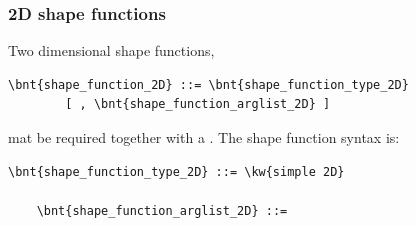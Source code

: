 \begin{enumerate}
\subsubsection{2D shape functions}
\label{sec:shape function 2D}
Two dimensional shape functions,
\begin{Verbatim}[commandchars=\\\{\}]
    \bnt{shape_function_2D} ::= \bnt{shape_function_type_2D}
        [ , \bnt{shape_function_arglist_2D} ]
\end{Verbatim}
mat be required together with a . The  shape function
syntax is:
\begin{Verbatim}[commandchars=\\\{\}]
    \bnt{shape_function_type_2D} ::= \kw{simple 2D}

    \bnt{shape_function_arglist_2D} ::=
\end{Verbatim}


\end{enumerate}



